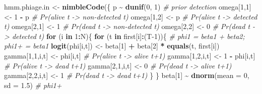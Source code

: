 \documentclass[
  12pt,
]{krantz}
\newenvironment{Shaded}{\begin{snugshade}}{\end{snugshade}}
\newcommand{\AttributeTok}[1]{\textcolor[rgb]{0.13,0.29,0.53}{#1}}
\newcommand{\CommentTok}[1]{\textcolor[rgb]{0.56,0.35,0.01}{\textit{#1}}}
\newcommand{\ControlFlowTok}[1]{\textcolor[rgb]{0.13,0.29,0.53}{\textbf{#1}}}
\newcommand{\DecValTok}[1]{\textcolor[rgb]{0.00,0.00,0.81}{#1}}
\newcommand{\FloatTok}[1]{\textcolor[rgb]{0.00,0.00,0.81}{#1}}
\newcommand{\FunctionTok}[1]{\textcolor[rgb]{0.13,0.29,0.53}{\textbf{#1}}}
\newcommand{\NormalTok}[1]{#1}
\newcommand{\OtherTok}[1]{\textcolor[rgb]{0.56,0.35,0.01}{#1}}
\newcommand{\SpecialCharTok}[1]{\textcolor[rgb]{0.81,0.36,0.00}{\textbf{#1}}}
\begin{document}
\begin{Shaded}
\begin{Highlighting}[]
\NormalTok{hmm.phiage.in }\OtherTok{\textless{}{-}} \FunctionTok{nimbleCode}\NormalTok{(\{}
\NormalTok{  p }\SpecialCharTok{\textasciitilde{}} \FunctionTok{dunif}\NormalTok{(}\DecValTok{0}\NormalTok{, }\DecValTok{1}\NormalTok{)                     }\CommentTok{\# prior detection}
\NormalTok{  omega[}\DecValTok{1}\NormalTok{,}\DecValTok{1}\NormalTok{] }\OtherTok{\textless{}{-}} \DecValTok{1} \SpecialCharTok{{-}}\NormalTok{ p                 }\CommentTok{\# Pr(alive t {-}\textgreater{} non{-}detected t)}
\NormalTok{  omega[}\DecValTok{1}\NormalTok{,}\DecValTok{2}\NormalTok{] }\OtherTok{\textless{}{-}}\NormalTok{ p                     }\CommentTok{\# Pr(alive t {-}\textgreater{} detected t)}
\NormalTok{  omega[}\DecValTok{2}\NormalTok{,}\DecValTok{1}\NormalTok{] }\OtherTok{\textless{}{-}} \DecValTok{1}                     \CommentTok{\# Pr(dead t {-}\textgreater{} non{-}detected t)}
\NormalTok{  omega[}\DecValTok{2}\NormalTok{,}\DecValTok{2}\NormalTok{] }\OtherTok{\textless{}{-}} \DecValTok{0}                     \CommentTok{\# Pr(dead t {-}\textgreater{} detected t)}
  \ControlFlowTok{for}\NormalTok{ (i }\ControlFlowTok{in} \DecValTok{1}\SpecialCharTok{:}\NormalTok{N)\{}
    \ControlFlowTok{for}\NormalTok{ (t }\ControlFlowTok{in}\NormalTok{ first[i]}\SpecialCharTok{:}\NormalTok{(T}\DecValTok{{-}1}\NormalTok{))\{}
    \CommentTok{\# phi1 = beta1 + beta2; phi1+ = beta1}
    \FunctionTok{logit}\NormalTok{(phi[i,t]) }\OtherTok{\textless{}{-}}\NormalTok{ beta[}\DecValTok{1}\NormalTok{] }\SpecialCharTok{+}\NormalTok{ beta[}\DecValTok{2}\NormalTok{] }\SpecialCharTok{*} \FunctionTok{equals}\NormalTok{(t, first[i]) }
\NormalTok{    gamma[}\DecValTok{1}\NormalTok{,}\DecValTok{1}\NormalTok{,i,t] }\OtherTok{\textless{}{-}}\NormalTok{ phi[i,t]        }\CommentTok{\# Pr(alive t {-}\textgreater{} alive t+1)}
\NormalTok{    gamma[}\DecValTok{1}\NormalTok{,}\DecValTok{2}\NormalTok{,i,t] }\OtherTok{\textless{}{-}} \DecValTok{1} \SpecialCharTok{{-}}\NormalTok{ phi[i,t]    }\CommentTok{\# Pr(alive t {-}\textgreater{} dead t+1)}
\NormalTok{    gamma[}\DecValTok{2}\NormalTok{,}\DecValTok{1}\NormalTok{,i,t] }\OtherTok{\textless{}{-}} \DecValTok{0}               \CommentTok{\# Pr(dead t {-}\textgreater{} alive t+1)}
\NormalTok{    gamma[}\DecValTok{2}\NormalTok{,}\DecValTok{2}\NormalTok{,i,t] }\OtherTok{\textless{}{-}} \DecValTok{1}               \CommentTok{\# Pr(dead t {-}\textgreater{} dead t+1)}
\NormalTok{    \}}
\NormalTok{  \}}
\NormalTok{  beta[}\DecValTok{1}\NormalTok{] }\SpecialCharTok{\textasciitilde{}} \FunctionTok{dnorm}\NormalTok{(}\AttributeTok{mean =} \DecValTok{0}\NormalTok{, }\AttributeTok{sd =} \FloatTok{1.5}\NormalTok{) }\CommentTok{\# phi1+}

\end{Highlighting}
\end{Shaded}
\end{document}
